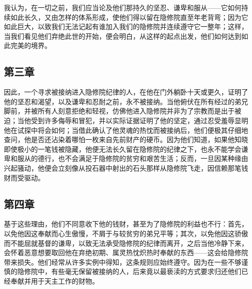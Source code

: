 我认为，在一切之前，我们应当论及他们那持久的坚忍、谦卑和服从——它如何持续如此长久，又由怎样的体系形成，使他们得以留在隐修院直至年老背弯；因为它如此巨大，以致我们无法记起有谁加入我们的隐修院并连续遵守它一整年；这样，当我们看见他们弃绝此世的开始，便会明白，从这样的起点出发，他们如何达到如此完美的境界。\par


\subsection{第三章}

\par

因此，一个寻求被接纳进入隐修院纪律的人，在他在门外躺卧十天或更久，证明了他的坚忍和渴望，以及谦卑和忍耐之前，永不被接纳。当他俯伏在所有经过的弟兄脚前，并被所有人刻意拒绝和轻视，仿佛他进入隐修院并非为了宗教而是出于被迫；当他受到许多侮辱和冒犯，并以实际证据证明了他的坚定，通过忍受羞辱显明他在试探中将会如何；当借此确认了他灵魂的热忱而被接纳后，他们便极其仔细地查问，他是否还沾染着哪怕一枚来自先前财产的硬币。因为他们知道，如果他知晓即使极小的一笔钱被隐藏，他便无法长久留在隐修院的纪律之下，也永不能学会谦卑和服从的德行，也不会满足于隐修院的贫穷和艰苦生活；反而，一旦因某种缘由兴起骚动，他便会立刻像从投石器中射出的石头那样从隐修院飞走，因信赖那笔钱财而受驱动。\par


\subsection{第四章}

\par

基于这些理由，他们不同意收下他的钱财，甚至为了隐修院的利益也不行：首先，以免他因这奉献而心生傲慢，不屑于与较贫穷的弟兄平等；其次，以免他因这骄傲而不能屈就基督的谦卑，以致无法承受隐修院的纪律而离开，之后当他冷静下来，会怀着恶意想要取回他在弃绝初期、属灵热忱炽热时奉献的东西——这会给隐修院带来损失。他们经常从许多实例中得知，这条规则应始终遵守。因为在一些不够谨慎的隐修院中，有些毫无保留被接纳的人，后来竟以最亵渎的方式要求归还他们已经奉献并用于天主工作的财物。\par

